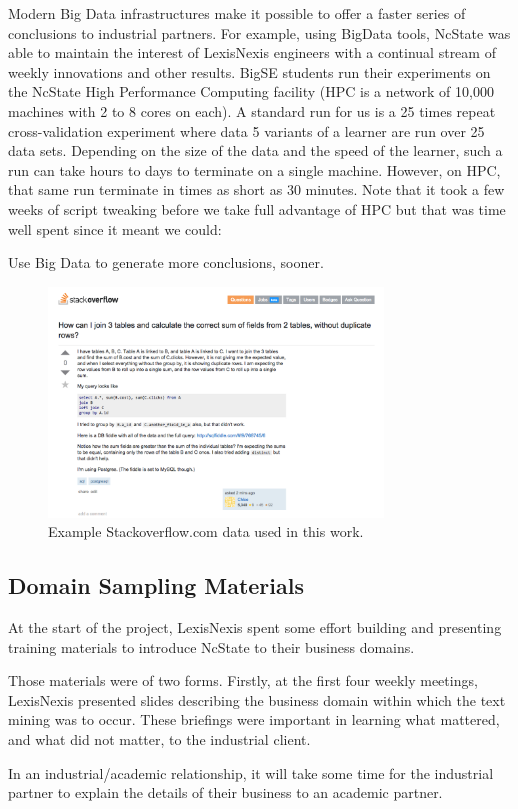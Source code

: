 \documentclass{sig-alternate-05-2015}
\theoremstyle{break}
\begin{document}
Modern Big Data infrastructures make it possible to offer a faster series of conclusions to industrial partners.
For example, using BigData tools,
NcState was able to maintain the interest
of LexisNexis engineers with a continual stream of
weekly innovations and other results. BigSE students run their experiments on the   NcState
High Performance Computing facility (HPC is a network of 10,000 machines with 2 to 8 cores on each).
A standard run for us is a 25 times repeat cross-validation experiment where data
5 variants of a learner are run over 25 data sets. Depending on the size of the data and the speed of the learner, such a run can take hours to days to 
terminate on a single machine.  However, on HPC, that same run terminate in times
as short as 30 minutes. Note that it took a few
weeks of script tweaking before we take full   advantage
of HPC but that was time well spent since it meant we could:
\begin{lesson}
Use Big Data     to generate
more conclusions, sooner.
\end{lesson}  
\begin{figure}
\includegraphics[width=3.5in]{fig/example.png}
\caption{Example Stackoverflow.com data used in this work.}\label{fig:example}
\end{figure}
\subsection{Domain Sampling Materials}
At the start of the project, LexisNexis spent some effort
building and presenting training materials to 
introduce NcState to their business domains.

Those materials were of two forms. Firstly,
at the first four weekly 
meetings, LexisNexis presented slides 
describing the business
domain within which the text mining was to occur. 
These briefings were important in learning what
mattered, and what did not matter, to the industrial
client.
\begin{lesson}
In an industrial/academic
relationship, it will take
some time for the industrial
partner to explain the details
of their business to an academic partner. 
\end{lesson}  
\end{document}
